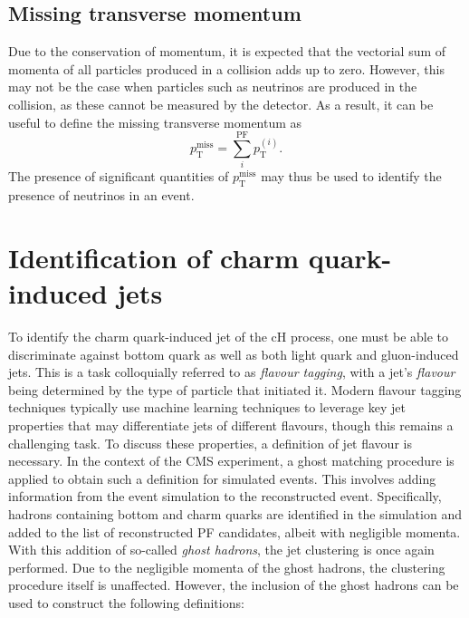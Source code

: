 \subsection{Missing transverse momentum}
Due to the conservation of momentum, it is expected that the vectorial sum of momenta of all particles produced in a collision adds up to zero. However, this may not be the case when particles such as neutrinos are produced in the collision, as these cannot be measured by the detector. As a result, it can be useful to define the missing transverse momentum as 
\begin{equation}
    p_{\mathrm{T}}^{\mathrm{miss}} = \sum^{\mathrm{PF}}_{i} p_{\mathrm{T}}^{(i)}. 
\end{equation}
The presence of significant quantities of $p_{\mathrm{T}}^{\mathrm{miss}}$ may thus be used to identify the presence of neutrinos in an event.

\section{Identification of charm quark-induced jets}
\label{sec:charmTagging}
To identify the charm quark-induced jet of the cH process, one must be able to discriminate against bottom quark as well as both light quark and gluon-induced jets. This is a task colloquially referred to as \textit{flavour tagging}, with a jet's \textit{flavour} being determined by the type of particle that initiated it. Modern flavour tagging techniques typically use machine learning techniques to leverage key jet properties that may differentiate jets of different flavours, though this remains a challenging task. To discuss these properties, a definition of jet flavour is necessary. In the context of the CMS experiment, a ghost matching procedure \cite{GhostMatching} is applied to obtain such a definition for simulated events. This involves adding information from the event simulation to the reconstructed event. Specifically, hadrons containing bottom and charm quarks are identified in the simulation and added to the list of reconstructed PF candidates, albeit with negligible momenta. With this addition of so-called \textit{ghost hadrons}, the jet clustering is once again performed. Due to the negligible momenta of the ghost hadrons, the clustering procedure itself is unaffected. However, the inclusion of the ghost hadrons can be used to construct the following definitions:

